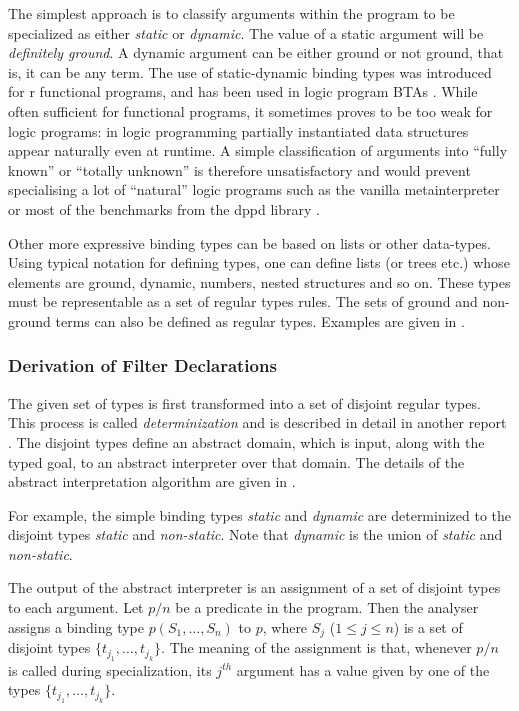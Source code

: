 \documentclass[12pt,twoside]{article}
\begin{document}
The simplest approach is to classify arguments within the program
 to be specialized as either {\em static} or {\em dynamic}.
The value of a static
 argument will be {\em definitely ground}.  A dynamic argument
can be either ground or not ground, that is, it can be any term.
The use of static-dynamic binding types was introduced
for r functional programs, 
and has been used in logic program BTAs  \cite{MogensenBondorf:LOPSTR92}.
While often sufficient for functional programs,
it sometimes
proves to be too weak for logic programs: in logic programming
partially instantiated data structures appear naturally even at
runtime. A simple classification of arguments into ``fully
known'' or ``totally unknown'' is therefore unsatisfactory and
would prevent specialising a lot of ``natural'' logic programs such
as the vanilla metainterpreter
\cite{HillGallagher:metachapter,MartensDeSchreye:metachapter}
 or most of the benchmarks from the {\sc dppd} library
 \cite{Leuschel96:ecce-dppd}.

Other more expressive binding types can be based on lists or other data-types. Using typical
notation for defining types, one can define lists (or trees etc.)
whose elements are
ground, dynamic, numbers, nested structures and so on.    
These types must be representable as a set of regular types rules.
The sets of ground and non-ground terms can also be
defined as regular types.   Examples are given in \cite{disjoint-types}.

\subsubsection{Derivation of Filter Declarations}

The given set of types is first transformed into a set of disjoint regular types.
This process is called {\em determinization} and
is described in detail in another report \cite{disjoint-types}.  The
disjoint types define an abstract domain, which is input,
along with the typed goal, to an abstract interpreter over that domain.
The details of the abstract interpretation algorithm are given
in  \cite{disjoint-types}.

For example, the simple binding types {\em static} and {\em dynamic}
are determinized to the disjoint types {\em static} and {\em non-static}.
Note that {\em dynamic} is the union of {\em static} and {\em non-static}.

The output of the abstract interpreter is an assignment of a set of disjoint types
to each argument.  Let $p/n$ be a predicate in the program.
Then the analyser assigns a binding type $p(S_1,\ldots,S_n)$
to $p$, where $S_j$ ($1 \le j \le n$) is a set of disjoint types
$\{t_{j_1},\ldots,t_{j_k}\}$.  The meaning of the assignment is that,
whenever $p/n$ is called during specialization, its $j^{th}$
argument has a value given by one of the types $\{t_{j_1},\ldots,t_{j_k}\}$.
\end{document}

